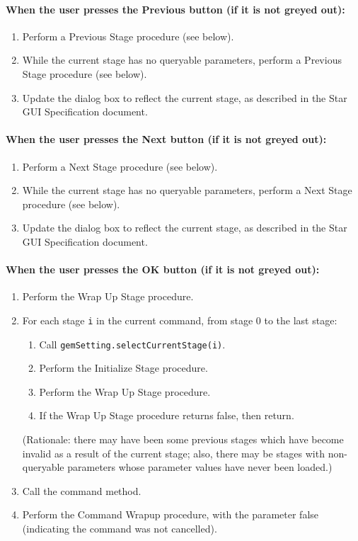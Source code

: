 \documentclass[11pt]{article}
\begin{document}
\paragraph{When the user presses the Previous button (if it is not greyed out):}
\begin{enumerate}
\item Perform a Previous Stage procedure (see below).
\item While the current stage has no queryable parameters, perform
  a Previous Stage procedure (see below).
\item Update the dialog box to reflect the current stage, as described
  in the Star GUI Specification document.
\end{enumerate}

\paragraph{When the user presses the Next button (if it is not greyed out):}
\begin{enumerate}
\item Perform a Next Stage procedure (see below).
\item While the current stage has no queryable parameters, perform
  a Next Stage procedure (see below).
\item Update the dialog box to reflect the current stage, as described
  in the Star GUI Specification document.
\end{enumerate}

\paragraph{When the user presses the OK button (if it is not greyed out):}
\begin{enumerate}
\item Perform the Wrap Up Stage procedure.
\item For each stage \verb/i/ in the current command, from stage 0 to the
  last stage:
  \begin{enumerate}
  \item Call {\tt gemSetting.selectCurrentStage(i)}.
  \item Perform the Initialize Stage procedure.
  \item Perform the Wrap Up Stage procedure.
  \item If the Wrap Up Stage procedure returns false, then return.
  \end{enumerate}
  (Rationale:  there may have been some previous stages which have
  become invalid as a result of the current stage; also, there may be
  stages with non-queryable parameters whose parameter values have never
  been loaded.)
\item Call the command method.
\item Perform the Command Wrapup procedure, with the parameter false
  (indicating the command was not cancelled).
\end{enumerate}
\end{document}
